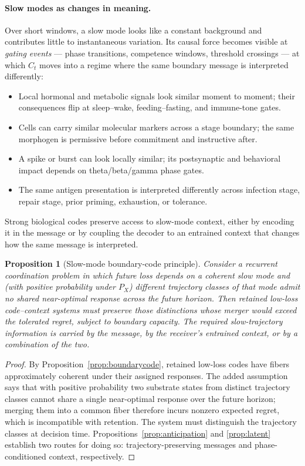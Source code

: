\documentclass[12pt]{article}
\newtheorem{proposition}{Proposition}
\theoremstyle{definition}
\begin{document}
\paragraph{Slow modes as changes in meaning.} Over short windows, a slow mode looks like a constant background and contributes little to instantaneous variation. Its causal force becomes visible at \emph{gating events} --- phase transitions, competence windows, threshold crossings --- at which $C_t$ moves into a regime where the same boundary message is interpreted differently:
\begin{itemize}
\item Local hormonal and metabolic signals look similar moment to moment; their consequences flip at sleep--wake, feeding--fasting, and immune-tone gates.
\item Cells can carry similar molecular markers across a stage boundary; the same morphogen is permissive before commitment and instructive after.
\item A spike or burst can look locally similar; its postsynaptic and behavioral impact depends on theta/beta/gamma phase gates.
\item The same antigen presentation is interpreted differently across infection stage, repair stage, prior priming, exhaustion, or tolerance.
\end{itemize}
Strong biological codes preserve access to slow-mode context, either by encoding it in the message or by coupling the decoder to an entrained context that changes how the same message is interpreted.

\begin{proposition}[Slow-mode boundary-code principle]
\label{prop:longwave}
Consider a recurrent coordination problem in which future loss depends on a coherent slow mode and (with positive probability under $P_X$) different trajectory classes of that mode admit no shared near-optimal response across the future horizon. Then retained low-loss code--context systems must preserve those distinctions whose merger would exceed the tolerated regret, subject to boundary capacity. The required slow-trajectory information is carried by the message, by the receiver's entrained context, or by a combination of the two.
\end{proposition}

\begin{proof}
By Proposition~\ref{prop:boundarycode}, retained low-loss codes have fibers approximately coherent under their assigned responses. The added assumption says that with positive probability two substrate states from distinct trajectory classes cannot share a single near-optimal response over the future horizon; merging them into a common fiber therefore incurs nonzero expected regret, which is incompatible with retention. The system must distinguish the trajectory classes at decision time. Propositions~\ref{prop:anticipation} and \ref{prop:latent} establish two routes for doing so: trajectory-preserving messages and phase-conditioned context, respectively.
\end{proof}
\end{document}
